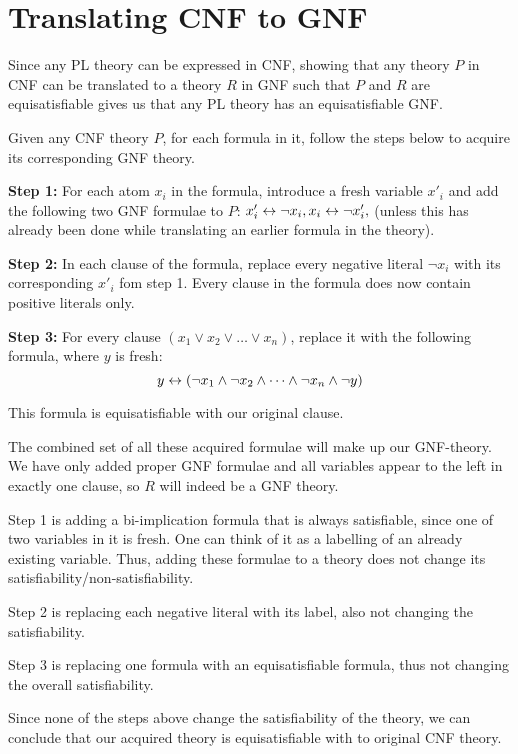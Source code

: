 \section{Translating CNF to GNF}
\label{sec:Translating CNF to GNF}
Since any PL theory can be expressed in CNF, showing that any theory $P$ in CNF can be translated to a theory $R$ in GNF such that $P$ and $R$ are equisatisfiable gives us that any PL theory has an equisatisfiable GNF.

Given any CNF theory $P$, for each formula in it, follow the steps below to acquire its corresponding GNF theory.

\textbf{Step 1:}
For each atom $x_i$ in the formula, introduce a fresh variable $x'_i$ and add the following two GNF formulae to $P$:
$x'_i \leftrightarrow \neg x_i, x_i \leftrightarrow \neg x'_i,$ (unless this has already been done while translating an earlier formula in the theory).

\textbf{Step 2:}
In each clause of the formula, replace every negative literal $\neg x_i$ with its corresponding $x'_i$ fom step 1.
Every clause in the formula does now contain positive literals only.

\textbf{Step 3:}
For every clause $(x_1 \vee x_2 \vee \dots \vee x_n)$, replace it with the following formula, where $y$ is fresh:
\[y \leftrightarrow (\neg x_1 \wedge \neg x_2 \wedge \dots \wedge \neg x_n \wedge \neg y)\]

This formula is equisatisfiable with our original clause.

The combined set of all these acquired formulae will make up our GNF-theory.
We have only added proper GNF formulae and all variables appear to the left in exactly one clause, so $R$ will indeed be a GNF theory.

Step 1 is adding a bi-implication formula that is always satisfiable, since one of two variables in it is fresh.
One can think of it as a labelling of an already existing variable.
Thus, adding these formulae to a theory does not change its satisfiability/non-satisfiability.

Step 2 is replacing each negative literal with its label, also not changing the satisfiability.

Step 3 is replacing one formula with an equisatisfiable formula, thus not changing the overall satisfiability.

Since none of the steps above change the satisfiability of the theory, we can conclude that our acquired theory is equisatisfiable with to original CNF theory.

